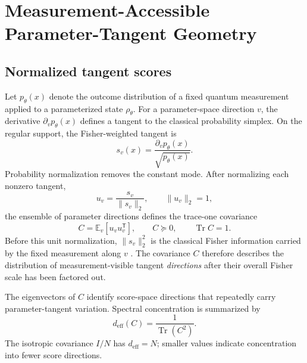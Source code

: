 
\section{Measurement-Accessible Parameter-Tangent Geometry}

\subsection{Normalized tangent scores}

Let $p_\theta(x)$ denote the outcome distribution of a fixed quantum measurement applied to a parameterized state $\rho_\theta$. For a parameter-space direction $v$, the derivative $\partial_v p_\theta(x)$ defines a tangent to the classical probability simplex. On the regular support, the Fisher-weighted tangent is
\begin{equation}
 s_v(x)=\frac{\partial_v p_\theta(x)}{\sqrt{p_\theta(x)}}.
\label{eq:aqt-score}
\end{equation}
Probability normalization removes the constant mode. After normalizing each nonzero tangent,
\begin{equation}
 u_v=\frac{s_v}{\|s_v\|_2},
\qquad \|u_v\|_2=1,
\end{equation}
the ensemble of parameter directions defines the trace-one covariance
\begin{equation}
 C=\mathbb E_v[u_vu_v^{\mathsf T}],
\qquad C\succeq0,
\qquad \operatorname{Tr}C=1.
\label{eq:aqt-C}
\end{equation}
Before this unit normalization, $\|s_v\|_2^2$ is the classical Fisher information carried by the fixed measurement along $v$ \cite{BraunsteinCaves1994,LuLuoOh2012}. The covariance $C$ therefore describes the distribution of measurement-visible tangent \emph{directions} after their overall Fisher scale has been factored out.

The eigenvectors of $C$ identify score-space directions that repeatedly carry parameter-tangent variation. Spectral concentration is summarized by
\begin{equation}
 d_{\mathrm{eff}}(C)=\frac{1}{\operatorname{Tr}(C^2)}.
\label{eq:aqt-deff}
\end{equation}
The isotropic covariance $I/N$ has $d_{\mathrm{eff}}=N$; smaller values indicate concentration into fewer score directions.

